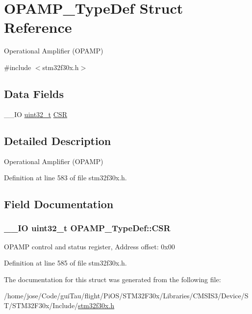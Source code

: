 \hypertarget{struct_o_p_a_m_p___type_def}{\section{O\-P\-A\-M\-P\-\_\-\-Type\-Def Struct Reference}
\label{struct_o_p_a_m_p___type_def}
}


Operational Amplifier (O\-P\-A\-M\-P)  




{\ttfamily \#include $<$stm32f30x.\-h$>$}

\subsection*{Data Fields}
\begin{DoxyCompactItemize}
\item 
\-\_\-\-\_\-\-I\-O \hyperlink{stdint_8h_a435d1572bf3f880d55459d9805097f62}{uint32\-\_\-t} \hyperlink{struct_o_p_a_m_p___type_def_aa3123f8a6ca8605b6687b9ee3f11e8ef}{C\-S\-R}
\end{DoxyCompactItemize}


\subsection{Detailed Description}
Operational Amplifier (O\-P\-A\-M\-P) 

Definition at line 583 of file stm32f30x.\-h.



\subsection{Field Documentation}
\hypertarget{struct_o_p_a_m_p___type_def_aa3123f8a6ca8605b6687b9ee3f11e8ef}{
\subsubsection[{C\-S\-R}]{\setlength{\rightskip}{0pt plus 5cm}\-\_\-\-\_\-\-I\-O {\bf uint32\-\_\-t} O\-P\-A\-M\-P\-\_\-\-Type\-Def\-::\-C\-S\-R}}\label{struct_o_p_a_m_p___type_def_aa3123f8a6ca8605b6687b9ee3f11e8ef}
O\-P\-A\-M\-P control and status register, Address offset\-: 0x00 

Definition at line 585 of file stm32f30x.\-h.



The documentation for this struct was generated from the following file\-:\begin{DoxyCompactItemize}
\item 
/home/jose/\-Code/gui\-Tau/flight/\-Pi\-O\-S/\-S\-T\-M32\-F30x/\-Libraries/\-C\-M\-S\-I\-S3/\-Device/\-S\-T/\-S\-T\-M32\-F30x/\-Include/\hyperlink{stm32f30x_8h}{stm32f30x.\-h}\end{DoxyCompactItemize}
